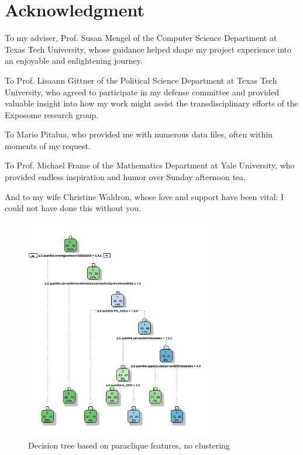 \documentclass[conference,compsoc]{IEEEtran}
\begin{document}
\section*{Acknowledgment}

To my adviser, Prof. Susan Mengel of the Computer Science Department at Texas Tech University, whose guidance helped shape
my project experience into an enjoyable and enlightening journey.

To Prof. Lisaann Gittner of the Political Science Department at Texas Tech University, who agreed to participate in my defense
committee and provided valuable insight into how my work might assist the transdisciplinary efforts of the Exposome research group.

To Mario Pitalua, who provided me with numerous data files, often within moments of my request.

To Prof. Michael Frame of the Mathematics Department at Yale University, who provided endless inspiration and humor over Sunday
afternoon tea.

And to my wife Christine Waldron, whose love and support have been vital: I could not have done this without you.


\begin{figure}[!t]
\centering
\includegraphics[width=3.25in]{decision-tree-01-paraclique-no-clustering.png}
\caption{Decision tree based on paraclique features, no clustering}
\label{decision.tree.01}
\end{figure}
\end{document}
